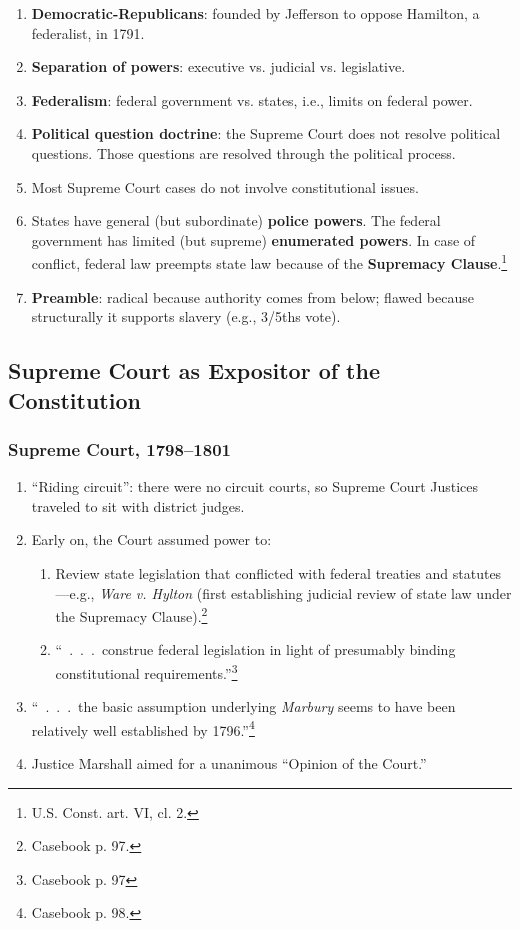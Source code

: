\begin{enumerate}
    \item \textbf{Democratic-Republicans}: founded by Jefferson to oppose 
    Hamilton, a federalist, in 1791.
    \item \textbf{Separation of powers}: executive vs. judicial vs. 
    legislative.
    \item \textbf{Federalism}: federal government vs. states, i.e., limits on 
    federal power.
    \item \textbf{Political question doctrine}: the Supreme Court does not 
    resolve political questions. Those questions are resolved through the 
    political process.
    \item Most Supreme Court cases do not involve constitutional issues.
    \item States have general (but subordinate) \textbf{police powers}. The 
    federal government has limited (but supreme) \textbf{enumerated powers}. 
    In case of conflict, federal law preempts state law because of the 
    \textbf{Supremacy Clause}.\footnote{U.S. Const. art. VI, cl. 2.}
    \item \textbf{Preamble}: radical because authority comes from below; 
    flawed because structurally it supports slavery (e.g., 3/5ths vote).
\end{enumerate}

\subsection{Supreme Court as Expositor of the Constitution}

\subsubsection{Supreme Court, 1798--1801}

\begin{enumerate}
    \item ``Riding circuit'': there were no circuit courts, so Supreme Court 
    Justices traveled to sit with district judges.
    \item Early on, the Court assumed power to:
    \begin{enumerate}
        \item Review state legislation that conflicted with 
        federal treaties and statutes---e.g., \emph{Ware v. Hylton} (first 
        establishing judicial review of state law under the Supremacy 
        Clause).\footnote{Casebook p. 97.}
        \item ``~.~.~.~construe federal legislation in light of 
        presumably binding constitutional requirements.''\footnote{Casebook p. 
        97}
    \end{enumerate}
    \item ``~.~.~.~the basic assumption underlying \emph{Marbury} seems to 
    have been relatively well established by 1796.''\footnote{Casebook p. 98.}
    \item Justice Marshall aimed for a unanimous ``Opinion of the Court.''
\end{enumerate}

